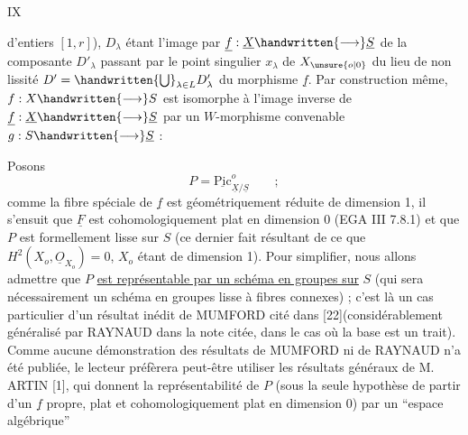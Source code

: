 \hfill IX

d'entiers $[1,r]$), $D_\lambda$ étant l'image par $\underline{f}:\underline{X}\handwritten{\longrightarrow}\underline{S}$ de la composante $D'_\lambda$ passant par le point singulier $x_\lambda$ de $X_{\unsure{o|0}}$ du lieu de non lissité $D'=\handwritten{\bigcup}_{\lambda\in L}D'_\lambda$ du morphisme $\underline{f}$. Par construction même, $f:X\handwritten{\longrightarrow} S$ est isomorphe à l'image inverse de $\underline{f}:\underline{X}\handwritten{\longrightarrow}\underline{S}$ par un $W$-morphisme convenable $g:S\handwritten{\longrightarrow}\underline{S}$ :


Posons
\[
 P=\underline{\mathrm{Pic}}^{o}_{\underline{X}/\underline{S}}\qquad ;\tag*{(12.8.3)}
\]
comme la fibre spéciale de $\underline{f}$ est géométriquement réduite de dimension 1, il s'ensuit que $\underline{F}$ est cohomologiquement plat en dimension 0 (EGA III 7.8.1) et que $P$ \deleted{\unsure{$-$}}est formellement lisse sur $S$ (ce dernier fait résultant de ce que $H^2(X_o,\underline{O}_{X_o})=0$, $X_o$ étant de dimension 1). Pour simplifier, nous allons admettre que $P$ \uline{est représentable par un schéma en groupes sur} $S$ (qui sera nécessairement un schéma en groupes lisse à fibres connexes) ; c'est là un cas particulier d'un résultat inédit de MUMFORD cité dans [22](considérablement généralisé par RAYNAUD dans la note citée, dans le cas où la base est un trait). Comme aucune démonstration des résultats de MUMFORD ni de RAYNAUD n'a été publiée, le lecteur préfèrera peut-être utiliser les résultats généraux de M. ARTIN [1], qui donnent la représentabilité de $P$ (sous la seule hypothèse de partir d'un $\underline{f}$ propre, plat et cohomologiquement plat en dimension 0) par un ``espace algébrique''

